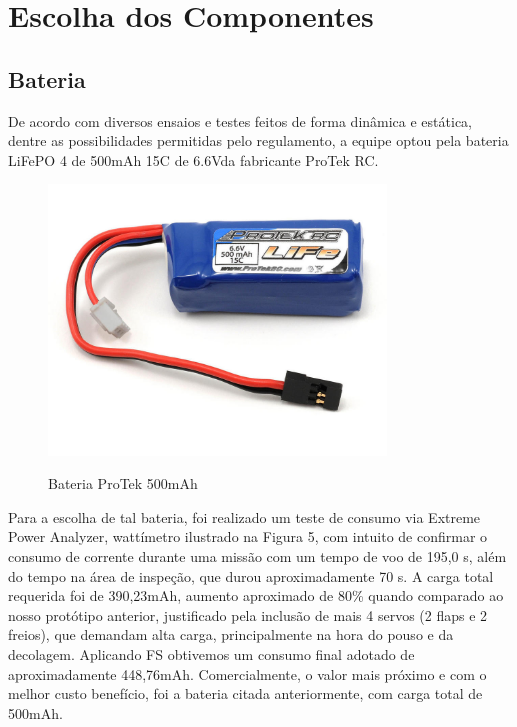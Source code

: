 \chapter{Escolha dos Componentes}\label{escolha_componentes.cap}
\section{Bateria}

De acordo com diversos ensaios e testes feitos de forma dinâmica e estática, dentre as
possibilidades permitidas pelo regulamento, a equipe optou pela bateria LiFePO 4 de 500mAh
15C de 6.6Vda fabricante ProTek RC.

\begin{figure}[H]
    \centering
    \caption{Bateria ProTek 500mAh}
    \includegraphics[width=0.8\textwidth]{./Imagens/bateria}
    \label{fig:bateria}
\end{figure}

Para a escolha de tal bateria, foi realizado um teste de consumo via Extreme Power
Analyzer, wattímetro ilustrado na Figura 5, com intuito de confirmar o consumo de corrente
durante uma missão com um tempo de voo de 195,0 s, além do tempo na área de inspeção, que
durou aproximadamente 70 s. A carga total requerida foi de 390,23mAh, aumento
aproximado de 80\% quando comparado ao nosso protótipo anterior, justificado pela
inclusão de mais 4 servos (2 flaps e 2 freios), que demandam alta carga, principalmente
na hora do pouso e da decolagem. Aplicando FS obtivemos um consumo final adotado de
aproximadamente 448,76mAh. Comercialmente, o valor mais próximo e com o melhor custo
benefício, foi a bateria citada anteriormente, com carga total de 500mAh.

